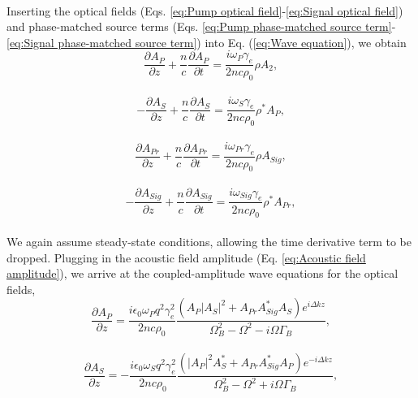 \documentclass[%
  reprint,
  superscriptaddress,
  amsmath,amssymb,
  aps,
  prapplied,
]{revtex4-2}
\begin{document}
\\
Inserting the optical fields (Eqs. \ref{eq:Pump optical field}-\ref{eq:Signal optical field}) and phase-matched source terms (Eqs. \ref{eq:Pump phase-matched source term}-\ref{eq:Signal phase-matched source term}) into Eq. (\ref{eq:Wave equation}), we obtain
\\
\begin{equation}
    \frac{\partial A_{P}}{\partial z} + \frac{n}{c}\frac{\partial A_{P}}{\partial t} = \frac{i\omega_{P}\gamma_{e}}{2nc\rho_{0}}\rho A_{2},
\end{equation}
\\
\begin{equation}
    -\frac{\partial A_{S}}{\partial z} + \frac{n}{c}\frac{\partial A_{S}}{\partial t} = \frac{i\omega_{S}\gamma_{e}}{2nc\rho_{0}}\rho^{*}A_{P},
\end{equation}
\\
\begin{equation}
    \frac{\partial A_{Pr}}{\partial z} + \frac{n}{c}\frac{\partial A_{Pr}}{\partial t} = \frac{i\omega_{Pr}\gamma_{e}}{2nc\rho_{0}}\rho A_{Sig},
\end{equation}
\\
\begin{equation}
    -\frac{\partial A_{Sig}}{\partial z} + \frac{n}{c}\frac{\partial A_{Sig}}{\partial t} = \frac{i\omega_{Sig}\gamma_{e}}{2nc\rho_{0}}\rho^{*}A_{Pr},
\end{equation}
\\
We again assume steady-state conditions, allowing the time derivative term to be dropped. Plugging in the acoustic field amplitude (Eq. \ref{eq:Acoustic field amplitude}), we arrive at the coupled-amplitude wave equations for the optical fields,
\\
\begin{equation}
    \frac{\partial A_{P}}{\partial z} = \frac{i\epsilon_{0}\omega_{P} q^{2}\gamma_{e}^{2}}{2nc\rho_{0}}\frac{(A_{P}|A_{S}|^{2} + A_{Pr}A_{Sig}^{*}A_{S})e^{i\Delta kz}}{\Omega_{B}^{2} - \Omega^{2} - i\Omega\Gamma_{B}},
    \label{eq:Pump coupled-amplitude wave equation}
\end{equation}
\\
\begin{equation}
    \frac{\partial A_{S}}{\partial z} = -\frac{i\epsilon_{0}\omega_{S} q^{2}\gamma_{e}^{2}}{2nc\rho_{0}}\frac{(|A_{P}|^{2}A_{S}^{*} + A_{Pr}A_{Sig}^{*}A_{P})e^{-i\Delta kz}}{\Omega_{B}^{2} - \Omega^{2} + i\Omega\Gamma_{B}},
\end{equation}
\\
\end{document}

